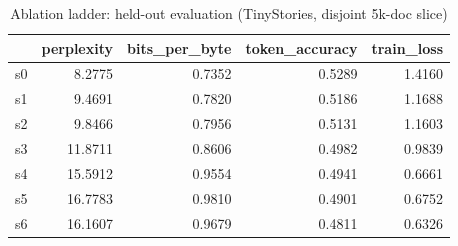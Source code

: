 \begin{table}[t]
\centering
\begin{tabular}{lrrrr}
\toprule
 & perplexity & bits\_per\_byte & token\_accuracy & train\_loss \\
\midrule
s0 & 8.2775 & 0.7352 & 0.5289 & 1.4160 \\
s1 & 9.4691 & 0.7820 & 0.5186 & 1.1688 \\
s2 & 9.8466 & 0.7956 & 0.5131 & 1.1603 \\
s3 & 11.8711 & 0.8606 & 0.4982 & 0.9839 \\
s4 & 15.5912 & 0.9554 & 0.4941 & 0.6661 \\
s5 & 16.7783 & 0.9810 & 0.4901 & 0.6752 \\
s6 & 16.1607 & 0.9679 & 0.4811 & 0.6326 \\
\bottomrule
\end{tabular}
\caption{Ablation ladder: held-out evaluation (TinyStories, disjoint 5k-doc slice)}
\label{tab:ablation-heldout}
\end{table}
